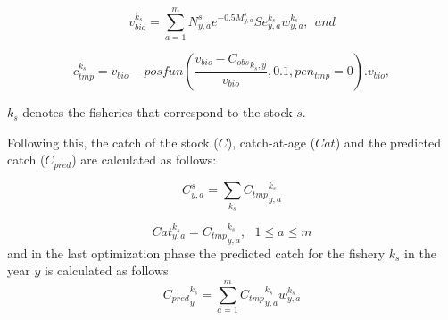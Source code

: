 \documentclass{article}
\begin{document}

\begin{equation}
v_{bio}^{k_s}=\sum_{a=1}^mN^s_{y,a}e^{-0.5M^s_{y,a}} Se_{y,a}^{k_s} w_{y,a}^{k_s}, \ \ and 
\end{equation}
    

\begin{equation}
c_{tmp}^{k_s} = v_{bio}-posfun\left(\frac{v_{bio} - {C_{obs}}_{k_s,y}}{v_{bio}} , 0.1 , pen_{tmp}=0 \right).v_{bio},
\end{equation}

 $k_s$ denotes the fisheries that correspond to the stock $s$.


Following this, the catch of the stock ($C$), catch-at-age ($Cat$) and the predicted catch ($C_{pred}$) are calculated as follows:

\begin{equation}
C^s_{y,a}=\sum_{k_s}{C_{tmp}}^{k_s}_{y,a} 
\end{equation}

\begin{equation}
Cat^{k_s}_{y,a}={C_{tmp}}^{k_s}_{y,a},  \  \  \ 1\leq a \leq m
\end{equation}
and in the last optimization phase the predicted catch for the fishery $k_s$ in the year $y$ is calculated as follows 
\begin{equation}
{C_{pred}}^{k_s}_y=\sum_{a=1}^{m}{C_{tmp}}^{k_s}_{y,a} w_{y,a}^{k_s}
\end{equation} 
\end{document}

